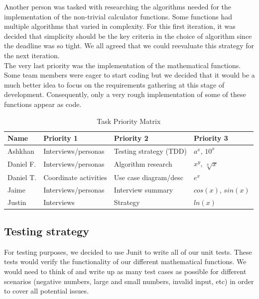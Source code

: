 \documentclass[a4paper]{article}
\begin{document}
Another person was tasked with researching the algorithms needed for the implementation of the non-trivial calculator functions. Some functions had multiple algorithms that varied in complexity. For this first iteration, it was decided that simplicity should be the key criteria in the choice of algorithm since the deadline was so tight. We all agreed that we could reevaluate this strategy for the next iteration. \\

The very last priority was the implementation of the mathematical functions. Some team members were eager to start coding but we decided that it would be a much better idea to focus on the requirements gathering at this stage of development. Consequently, only a very rough implementation of some of these functions appear as code. \\

\begin{table}[ht]
\centering
\caption{Task Priority Matrix}
\begin{tabular}{|l|l|l|l|}
\hline
\textbf{Name}&\textbf{Priority 1}  &\textbf{Priority 2}  &\textbf{Priority 3}  \\ \hline
 Ashkhan&Interviews/personas  &Testing strategy (TDD)  &$a^x$, $10^x$  \\ \hline
 Daniel F.&Interviews/personas  &Algorithm research  &$x^y$, $\sqrt[n]{x}$  \\ \hline
 Daniel T.&Coordinate activities  &Use case diagram/desc  &$e^x$  \\ \hline
 Jaime&Interviews/personas  &Interview summary  &$cos(x)$, $sin(x)$  \\ \hline
 Justin&Interviews  &Strategy  &$ln(x)$  \\ \hline
\end{tabular}
\end{table}

\subsection{Testing strategy}

For testing purposes, we decided to use Junit to write all of our unit tests. These tests would verify the functionality of our different mathematical functions. We would need to think of and write up as many test cases as possible for different scenarios (negative numbers, large and small numbers, invalid input, etc) in order to cover all potential issues. \\
\end{document}
